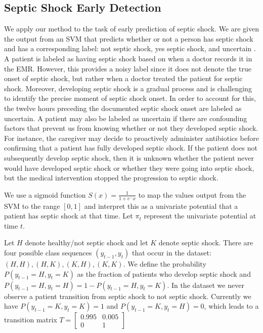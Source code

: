 \documentclass[12pt,solutions]{article}
\begin{document}
\subsection{Septic Shock Early Detection}

We apply our method to the task of early prediction of septic shock. We are given the output from an SVM that predicts whether or not a person has septic shock and has a corresponding label: not septic shock, yes septic shock, and uncertain \cite{Paxton2013}. A patient is labeled as having septic shock based on when a doctor records it in the EMR. However, this provides a noisy label since it does not denote the true onset of septic shock, but rather when a doctor treated the patient for septic shock. Moreover, developing septic shock is a gradual process and is challenging to identify the precise moment of septic shock onset. In order to account for this, the twelve hours preceding the documented septic shock onset are labeled as uncertain. A patient may also be labeled as uncertain if there are confounding factors that prevent us from knowing whether or not they developed septic shock. For instance, the caregiver may decide to proactively administer antibiotics before confirming that a patient has fully developed septic shock. If the patient does not subsequently develop septic shock, then it is unknown whether the patient never would have developed septic shock or whether they were going into septic shock, but the medical intervention stopped the progression to septic shock. 

We use a sigmoid function $S(x) = \frac{1}{1+e^-x}$ to map the values output from the SVM to the range $[0,1]$ and interpret this as a univariate potential that a patient has septic shock at that time. Let $\pi_t$ represent the univariate potential at time $t$.

Let $H$ denote healthy/not septic shock and let $K$ denote septic shock. There are four possible class sequences $(y_{t-1},y_t)$ that occur in the dataset: $(H,H), (H,K), (K,H), (K,K)$. We define the probability $P(y_{t-1}=H, y_t=K)$ as the fraction of patients who develop septic shock and $P(y_{t-1}=H, y_t=H) = 1 - P(y_{t-1}=H, y_t=K)$. In the dataset we never observe a patient transition from septic shock to not septic shock. Currently we have $P(y_{t-1}=K, y_t=K) = 1$ and  $P(y_{t-1}=K, y_t=H) = 0$, which leads to a transition matrix $T = \begin{bmatrix}0.995&0.005\\0&1\end{bmatrix}$
\end{document}
